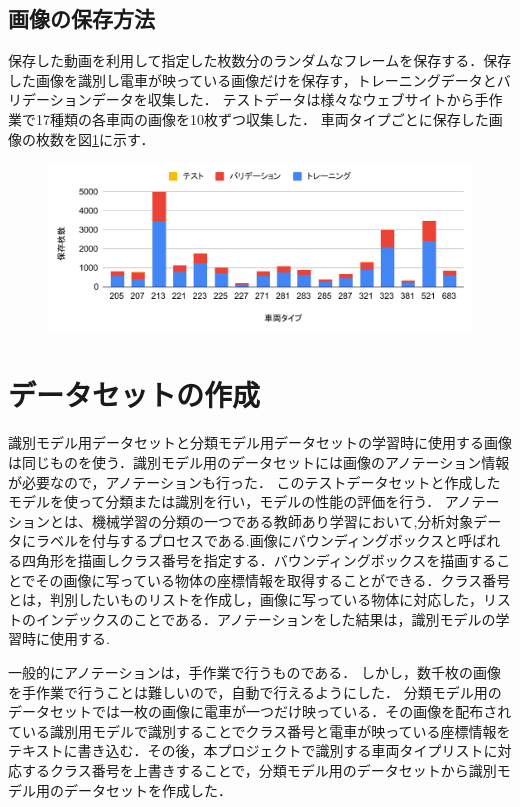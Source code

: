 \subsection{画像の保存方法}
保存した動画を利用して指定した枚数分のランダムなフレームを保存する．保存した画像を識別し電車が映っている画像だけを保存す，トレーニングデータとバリデーションデータを収集した．
テストデータは様々なウェブサイトから手作業で17種類の各車両の画像を10枚ずつ収集した．
車両タイプごとに保存した画像の枚数を図\ref{fig:chart}に示す．


\begin{figure}[H]
	\centering
	\includegraphics[width=\linewidth]{chap3/fig/chart2}
	\caption[各車両タイプ（全17種）の保存枚数]{}
	\label{fig:chart}
\end{figure}



\section{データセットの作成}

識別モデル用データセットと分類モデル用データセットの学習時に使用する画像は同じものを使う．識別モデル用のデータセットには画像のアノテーション情報が必要なので，アノテーションも行った．
このテストデータセットと作成したモデルを使って分類または識別を行い，モデルの性能の評価を行う．
アノテーションとは、機械学習の分類の一つである教師あり学習において,分析対象データにラベルを付与するプロセスである.画像にバウンディングボックスと呼ばれる四角形を描画しクラス番号を指定する．バウンディングボックスを描画することでその画像に写っている物体の座標情報を取得することができる．クラス番号とは，判別したいものリストを作成し，画像に写っている物体に対応した，リストのインデックスのことである．アノテーションをした結果は，識別モデルの学習時に使用する.

一般的にアノテーションは，手作業で行うものである．
しかし，数千枚の画像を手作業で行うことは難しいので，自動で行えるようにした．
分類モデル用のデータセットでは一枚の画像に電車が一つだけ映っている．その画像を配布されている識別用モデルで識別することでクラス番号と電車が映っている座標情報をテキストに書き込む．その後，本プロジェクトで識別する車両タイプリストに対応するクラス番号を上書きすることで，分類モデル用のデータセットから識別モデル用のデータセットを作成した．

